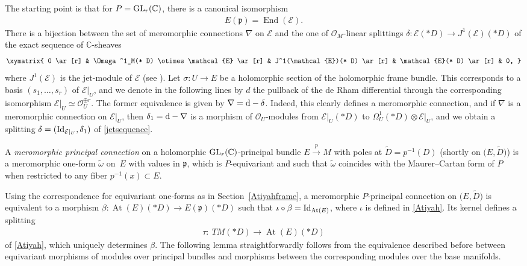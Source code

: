 \documentclass[10pt,a4paper]{amsart}
\numberwithin{equation}{section}
\begin{document}
 The starting point is that for $P={\rm GL}_r(\mathbb{C})$, there is a canonical isomorphism \cite[Proposition~9]{Atiyah}
 \begin{gather*}%
 E(\mathfrak{p}) = \operatorname{End}(\mathcal{E}).
 \end{gather*}
There is a bijection between the set of meromorphic connections $\nabla$ on $\mathcal{E}$ and the one of $\mathcal{O}_M$-linear splittings $\delta\colon \mathcal{E}(* D) \longrightarrow J^1(\mathcal{E})(* D)$ of the exact sequence of $\mathbb{C}$-sheaves
 \begin{gather}\label{jetsequence} \xymatrix{ 0 \ar[r] & \Omega^1_M(* D) \otimes \mathcal{E} \ar[r] & J^1(\mathcal{E})(* D) \ar[r] & \mathcal{E}(* D) \ar[r] & 0, }
 \end{gather}
 where $J^1(\mathcal{E})$ is the jet-module of $\mathcal{E}$ (see \cite[p.~193]{Atiyah}). Let $\sigma\colon U \longrightarrow E$ be a holomorphic section of the holomorphic frame bundle. This corresponds to a basis $(s_1,\dots,s_r)$ of $\mathcal{E}\vert_U$, and we denote in the following lines by $d$ the pullback of the de Rham differential through the corresponding isomorphism $\mathcal{E}\vert_U \simeq \mathcal{O}_U^{\oplus r}$. The former equivalence is given by $\nabla = {\rm d} - \delta$. Indeed, this clearly defines a meromorphic connection, and if $\nabla$ is a meromorphic connection on $\mathcal{E}\vert_U$, then $\delta_1 = {\rm d}-\nabla$ is a morphism of $\mathcal{O}_U$-modules from $\mathcal{E}\vert_U(* D)$ to $\Omega^1_U(* D) \otimes \mathcal{E}\vert_U$, and we obtain a splitting $\delta = ({\rm Id}_{\mathcal{E}\vert_U}, \delta_1)$ of \eqref{jetsequence}.

\begin{Definition}\label{principal} A \textit{meromorphic principal connection} on a holomorphic ${\rm GL}_r(\mathbb{C})$-principal bundle $E\overset{p}{\longrightarrow}M$ with poles at $\tilde{D}=p^{-1}(D)$ \big(shortly on $\big(E,\tilde{D}\big)$\big) is a meromorphic one-form $\tilde{\omega}$ on~$E$ with values in $\mathfrak{p}$, which is $P$-equivariant and such that $\tilde{\omega}$ coincides with the Maurer--Cartan form of $P$ when restricted to any fiber $p^{-1}(x) \subset E$. \end{Definition}
 Using the correspondence for equivariant one-forms as in Section~\ref{Atiyahframe}, a meromorphic $P$-principal connection on $\big(E,\tilde{D}\big)$ is equivalent to a morphism $\beta\colon \operatorname{At}(E)(* D) \longrightarrow E(\mathfrak{p})(* D)$ such that $\iota \circ \beta = {\rm Id}_{\operatorname{At}(E)}$, where $\iota$ is defined in \eqref{Atiyah}. Its kernel defines a splitting
\begin{gather}\label{tau}
 \tau\colon\ TM(* D) \longrightarrow \operatorname{At}(E)(* D)
 \end{gather}
 of \eqref{Atiyah}, which uniquely determines $\beta$. The following lemma straightforwardly follows from the equivalence described before between equivariant morphisms of modules over principal bundles and morphisms between the corresponding modules over the base manifolds.
\end{document}
